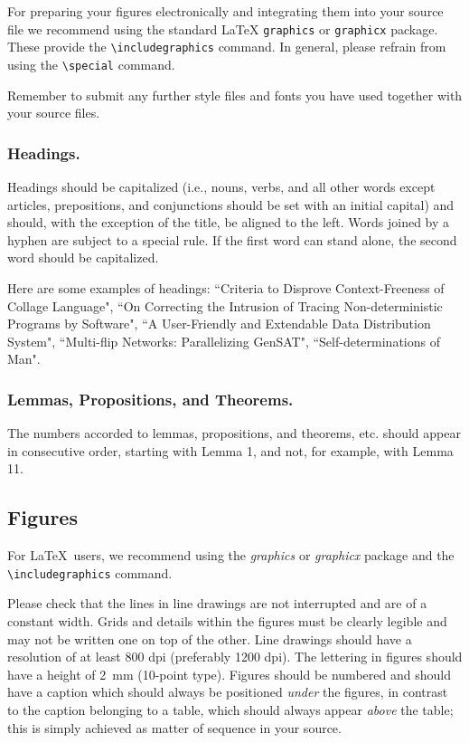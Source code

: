 \documentclass[runningheads]{llncs}
\begin{document}
For preparing your figures electronically and integrating them into
your source file we recommend using the standard \LaTeX{} \verb+graphics+ or
\verb+graphicx+ package. These provide the \verb+\includegraphics+ command.
In general, please refrain from using the \verb+\special+ command.

Remember to submit any further style files and
fonts you have used together with your source files.

\subsubsection{Headings.}

Headings should be capitalized
(i.e., nouns, verbs, and all other words
except articles, prepositions, and conjunctions should be set with an
initial capital) and should,
with the exception of the title, be aligned to the left.
Words joined by a hyphen are subject to a special rule. If the first
word can stand alone, the second word should be capitalized.

Here are some examples of headings: ``Criteria to Disprove
Context-Freeness of Collage Language", ``On Correcting the Intrusion of
Tracing Non-deterministic Programs by Software", ``A User-Friendly and
Extendable Data Distribution System", ``Multi-flip Networks:
Parallelizing GenSAT", ``Self-determinations of Man".

\subsubsection{Lemmas, Propositions, and Theorems.}

The numbers accorded to lemmas, propositions, and theorems, etc. should
appear in consecutive order, starting with Lemma 1, and not, for
example, with Lemma 11.

\subsection{Figures}

For \LaTeX\ users, we recommend using the \emph{graphics} or \emph{graphicx}
package and the \verb+\includegraphics+ command.

Please check that the lines in line drawings are not
interrupted and are of a constant width. Grids and details within the
figures must be clearly legible and may not be written one on top of
the other. Line drawings should have a resolution of at least 800 dpi
(preferably 1200 dpi). The lettering in figures should have a height of
2~mm (10-point type). Figures should be numbered and should have a
caption which should always be positioned \emph{under} the figures, in
contrast to the caption belonging to a table, which should always appear
\emph{above} the table; this is simply achieved as matter of sequence in
your source.
\end{document}
